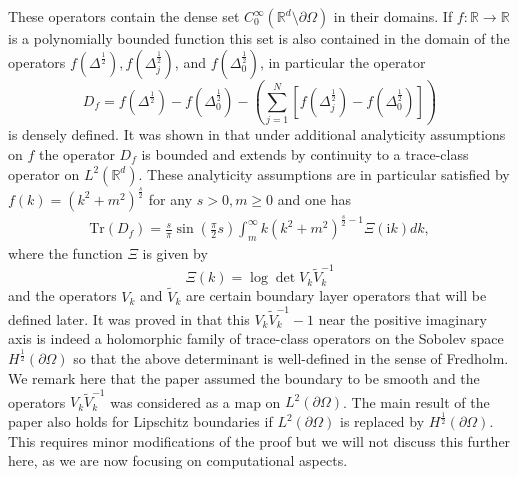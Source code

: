 These operators contain the dense set $C^\infty_0(\mathbb{R}^d \setminus \partial \Omega)$ in their domains.
If $f: \mathbb{R} \to \mathbb{R}$ is a polynomially bounded function this set is also contained in the domain of the operators
$f(\Delta^{\frac{1}{2}}), f(\Delta_{j}^{\frac{1}{2}})$, and $f(\Delta_{0}^{\frac{1}{2}})$, in particular the operator
$$
 D_{f} = f(\Delta^{\frac{1}{2}}) - f(\Delta_{0}^{\frac{1}{2}}) - \left(\sum_{j = 1}^{N}[f(\Delta_{j}^{\frac{1}{2}}) - f(\Delta_{0}^{\frac{1}{2}})]\right)
$$
is densely defined. It was shown in \cite{hanisch2020relative} that under additional analyticity assumptions on $f$ the operator
$D_{f}$ is bounded and extends by continuity to a trace-class operator on $L^2(\mathbb{R}^{d})$. 
These analyticity assumptions are in particular satisfied by $f(k) = (k^{2}+ m^{2})^{\frac{s}{2}}$ for any $s > 0, m \geq 0$ and one has
\begin{align}\label{trace formula in terms of the boundary op}
    \text{Tr}\left( D_{f} \right)  = \frac{s}{\pi} \sin\left(\frac{\pi}{2} s\right) \int_{m}^{\infty} k (k^{2} + m^{2})^{\frac{s}{2}-1}\Xi(\mathrm{i} k) dk,
\end{align}
where the function $\Xi$ is given by
$$
 \Xi(k) = \log \det V_{k} \tilde V_{k}^{-1}
$$
and the operators $V_{k}$ and $\tilde V_{k}$ are certain boundary layer operators that will be defined later. 
It was proved in  \cite{hanisch2020relative} that this $V_{k} \tilde V_{k}^{-1}-1$ near the positive imaginary axis is indeed a holomorphic family of trace-class operators on the Sobolev space $H^\frac{1}{2}(\partial \Omega)$  so that the above determinant is well-defined in the sense of Fredholm. We remark here that the paper \cite{hanisch2020relative} assumed the boundary to be smooth and the operators $V_k  \tilde V_k^{-1}$ was considered as a map on $L^2(\partial \Omega)$. The main result of the paper also holds for Lipschitz boundaries if $L^2(\partial \Omega)$ is replaced by $H^\frac{1}{2}(\partial \Omega)$. This requires minor modifications of the proof but we will not discuss this further here, as we are now focusing on computational aspects.

